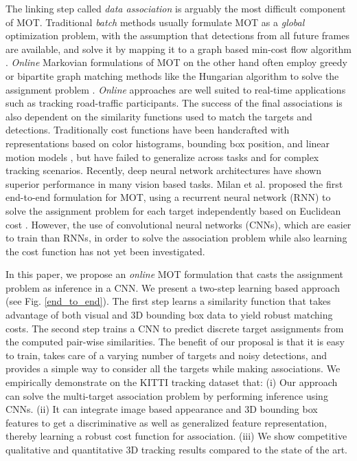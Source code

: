 \documentclass[letterpaper, 10 pt, conference]{ieeeconf}
\begin{document}
\par  The linking step called \textit{data association} is arguably the most difficult component of MOT. Traditional \textit{batch} methods usually formulate MOT as a \textit{global} optimization problem, with the assumption that detections from all future frames are available, and solve it by mapping it to a graph based min-cost flow algorithm \cite{netflow, globalopt}. \textit{Online} Markovian formulations of MOT on the other hand often employ greedy or bipartite graph matching methods like the Hungarian algorithm to solve the assignment problem \cite{Munkres57algorithmsfor, hungarian, breitenstein2009RobustTU}. \textit{Online} approaches are well suited to real-time applications such as tracking road-traffic participants. The success of the final associations is also dependent on the similarity functions used to match the targets and detections. Traditionally cost functions have been handcrafted with representations based on color histograms, bounding box position, and linear motion models \cite{appearance, pos}, but have failed to generalize across tasks and for complex tracking scenarios. Recently, deep neural network architectures have shown superior performance in many vision based tasks. Milan et al. proposed the first end-to-end formulation for MOT, using a recurrent neural network (RNN) to solve the assignment problem for each target independently based on Euclidean cost \cite{milan}. However, the use of convolutional neural networks (CNNs), which are easier to train than RNNs, in order to solve the association problem while also learning the cost function has not yet been investigated.

\par In this paper, we propose an \textit{online} MOT formulation that casts the assignment problem as inference in a CNN. We present a two-step learning based approach (see Fig. \ref{end_to_end}). The first step learns a similarity function that takes advantage of both visual and 3D bounding box data to yield robust matching costs. The second step trains a CNN to predict discrete target assignments from the computed pair-wise similarities. The benefit of our proposal is that it is easy to train, takes care of a varying number of targets and noisy detections, and provides a simple way to consider all the targets while making associations. We empirically demonstrate on the KITTI tracking dataset \cite{Kitti_Dataset} that: (i) Our approach can solve the multi-target association problem by performing inference using CNNs. (ii) It can integrate image based appearance and 3D bounding box features to get a discriminative as well as generalized feature representation, thereby learning a robust cost function for association. (iii) We show competitive qualitative and quantitative 3D tracking results compared to the state of the art. 
\end{document}
